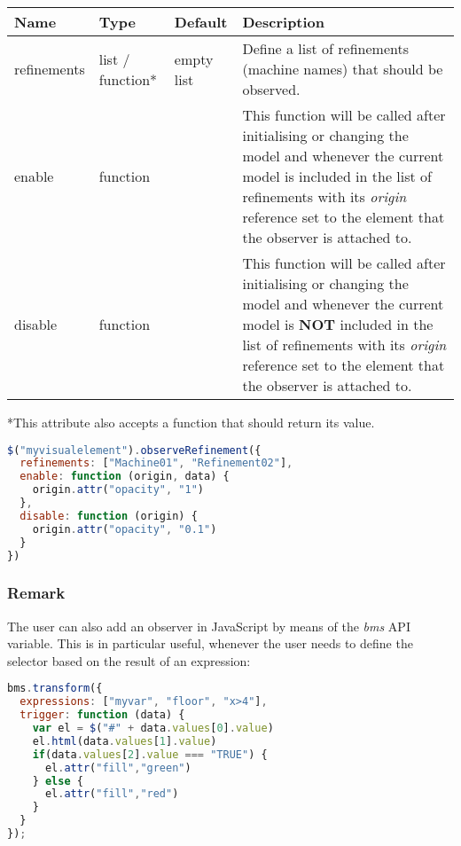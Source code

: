 \begin{tabular}{ l l l p{7cm} }
  \textbf{Name} & \textbf{Type} & \textbf{Default} & \textbf{Description} \\
  \hline\noalign{\medskip}
  refinements & list / function* & empty list & Define a list of refinements (machine names) that should be observed.\\
  \hline\noalign{\medskip}
  enable & function &  & This function will be called after initialising or changing the model and whenever the current model is included in the list of refinements with its \textit{origin} reference set to the element that the observer is attached to.\\
  \hline\noalign{\medskip}
  disable & function &  & This function will be called after initialising or changing the model and whenever the current model is \textbf{NOT} included in the list of refinements with its \textit{origin} reference set to the element that the observer is attached to.\\
\end{tabular}

*This attribute also accepts a function that should return its value.

\begin{lstlisting}[float=ht!,language=JavaScript]
$("myvisualelement").observeRefinement({
  refinements: ["Machine01", "Refinement02"],
  enable: function (origin, data) {
    origin.attr("opacity", "1")
  },
  disable: function (origin) {
    origin.attr("opacity", "0.1")
  }
})
\end{lstlisting}

\subsubsection{Remark}

The user can also add an observer in JavaScript by means of the \textit{bms} API variable. 
This is in particular useful, whenever the user needs to define the selector based on the result of an expression:

\begin{lstlisting}[float=ht!,language=JavaScript]
bms.transform({
  expressions: ["myvar", "floor", "x>4"],
  trigger: function (data) {
    var el = $("#" + data.values[0].value)
    el.html(data.values[1].value)
    if(data.values[2].value === "TRUE") {
      el.attr("fill","green")
    } else {
      el.attr("fill","red")
    }
  }
});
\end{lstlisting}

